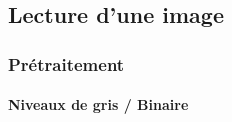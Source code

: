     \subsection{Lecture d'une image}

        \begin{frame}
            \frametitle{Prétraitement}
            \framesubtitle{Niveaux de gris / Binaire}
            \begin{columns}
                \begin{column}{.3\linewidth}
                \end{column}
                \begin{column}{.3\linewidth}

\end{column}
\end{columns}
\end{frame}
